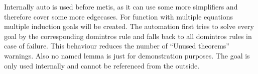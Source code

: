Internally auto is used before metis, as it can use some more simplifiers and therefore cover some more edgecases.
For function with multiple equations multiple induction goals will be created.
The automation first tries to solve every goal by the corresponding domintros rule and falls back to all domintros rules in case of failure.
This behaviour reduces the number of ``Unused theorems'' warnings.
Also no named lemma is just for demonstration purposes.
The goal is only used internally and cannot be referenced from the outside.
